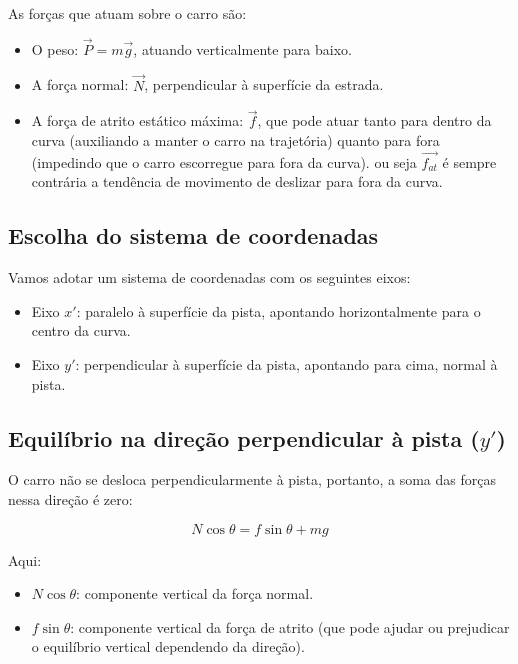 \documentclass[a4paper,12pt]{article}
\begin{document}
\begin{flushleft}
As forças que atuam sobre o carro são:

\begin{itemize}
  \item O peso: \( \vec{P} = m\vec{g} \), atuando verticalmente para baixo.
  \item A força normal: \( \vec{N} \), perpendicular à superfície da estrada.
  \item A força de atrito estático máxima: \( \vec{f} \), que pode atuar tanto para dentro da curva (auxiliando a manter o carro na trajetória) quanto para fora (impedindo que o carro escorregue para fora da curva).
  ou seja \( \vec{f_{at}} \) \'e sempre contr\'aria a tend\^encia de movimento de deslizar para fora da curva.
\end{itemize}

\subsection*{Escolha do sistema de coordenadas}

Vamos adotar um sistema de coordenadas com os seguintes eixos:

\begin{itemize}
  \item Eixo \( x' \): paralelo à superfície da pista, apontando horizontalmente para o centro da curva.
  \item Eixo \( y' \): perpendicular à superfície da pista, apontando para cima, normal à pista.
\end{itemize}

\subsection*{Equilíbrio na direção perpendicular à pista (\( y' \))}

O carro não se desloca perpendicularmente à pista, portanto, a soma das forças nessa direção é zero:

\begin{equation}
N \cos\theta = f \sin\theta + mg
\label{eq:equilibrio_y}
\end{equation}

Aqui:

\begin{itemize}
  \item \( N \cos\theta \): componente vertical da força normal.
  \item \( f \sin\theta \): componente vertical da força de atrito (que pode ajudar ou prejudicar o equilíbrio vertical dependendo da direção).
\end{itemize}


\end{flushleft}
\end{document}

